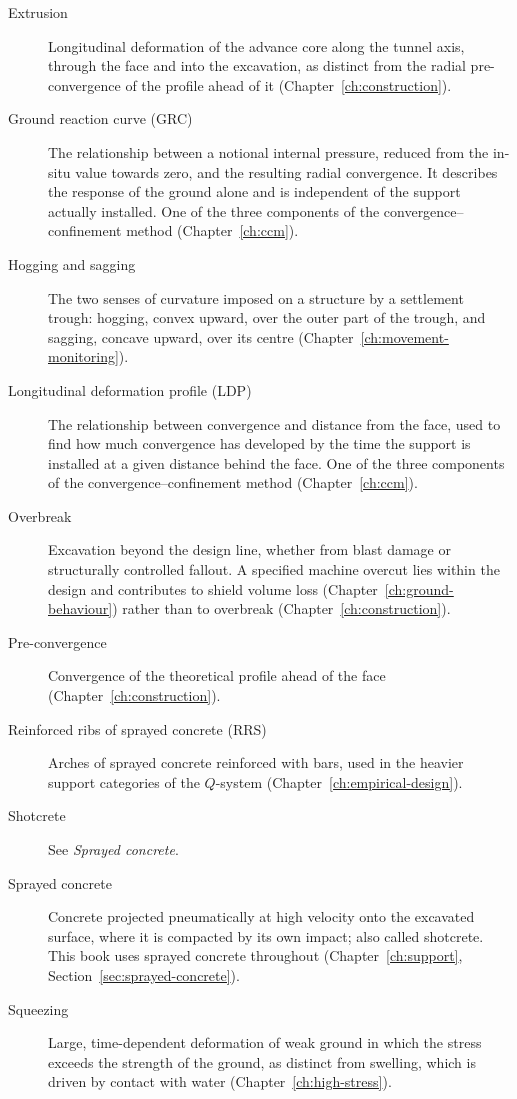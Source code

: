 \begin{description}
\item[Extrusion] Longitudinal deformation of the advance core along the tunnel axis, through the face and into the excavation, as distinct from the radial pre-convergence of the profile ahead of it (Chapter~\ref{ch:construction}).
\item[Ground reaction curve (GRC)] The relationship between a notional internal pressure, reduced from the in-situ value towards zero, and the resulting radial convergence. It describes the response of the ground alone and is independent of the support actually installed. One of the three components of the convergence--confinement method (Chapter~\ref{ch:ccm}).
\item[Hogging and sagging] The two senses of curvature imposed on a structure by a settlement trough: hogging, convex upward, over the outer part of the trough, and sagging, concave upward, over its centre (Chapter~\ref{ch:movement-monitoring}).
\item[Longitudinal deformation profile (LDP)] The relationship between convergence and distance from the face, used to find how much convergence has developed by the time the support is installed at a given distance behind the face. One of the three components of the convergence--confinement method (Chapter~\ref{ch:ccm}).
\item[Overbreak] Excavation beyond the design line, whether from blast damage or structurally controlled fallout. A specified machine overcut lies within the design and contributes to shield volume loss (Chapter~\ref{ch:ground-behaviour}) rather than to overbreak (Chapter~\ref{ch:construction}).
\item[Pre-convergence] Convergence of the theoretical profile ahead of the face (Chapter~\ref{ch:construction}).
\item[Reinforced ribs of sprayed concrete (RRS)] Arches of sprayed concrete reinforced with bars, used in the heavier support categories of the $Q$-system (Chapter~\ref{ch:empirical-design}).
\item[Shotcrete] See \emph{Sprayed concrete}.
\item[Sprayed concrete] Concrete projected pneumatically at high velocity onto the excavated surface, where it is compacted by its own impact; also called shotcrete. This book uses sprayed concrete throughout (Chapter~\ref{ch:support}, Section~\ref{sec:sprayed-concrete}).
\item[Squeezing] Large, time-dependent deformation of weak ground in which the stress exceeds the strength of the ground, as distinct from swelling, which is driven by contact with water (Chapter~\ref{ch:high-stress}).

\end{description}
